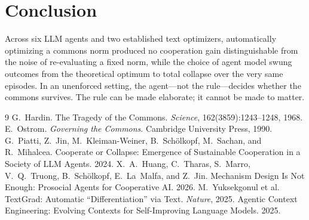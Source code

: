 \documentclass[11pt]{article}
\begin{document}
\section{Conclusion}
Across six LLM agents and two established text optimizers, automatically optimizing
a commons norm produced no cooperation gain distinguishable from the noise of
re-evaluating a fixed norm, while the choice of agent model swung outcomes from
the theoretical optimum to total collapse over the very same episodes. In an
unenforced setting, the agent---not the rule---decides whether the commons
survives. The rule can be made elaborate; it cannot be made to matter.

\begin{thebibliography}{9}
\small
{}
G.~Hardin. The Tragedy of the Commons. \emph{Science}, 162(3859):1243--1248, 1968.
E.~Ostrom. \emph{Governing the Commons}. Cambridge University Press, 1990.
G.~Piatti, Z.~Jin, M.~Kleiman-Weiner, B.~Sch\"olkopf, M.~Sachan, and R.~Mihalcea.
Cooperate or Collapse: Emergence of Sustainable Cooperation in a Society of LLM
Agents. 2024.
X.~A.~Huang, C.~Tharas, S.~Marro, V.~Q.~Truong, B.~Sch\"olkopf, E.~La~Malfa, and
Z.~Jin. Mechanism Design Is Not Enough: Prosocial Agents for Cooperative AI. 2026.
M.~Yuksekgonul et al. TextGrad: Automatic ``Differentiation'' via Text.
\emph{Nature}, 2025.
Agentic Context Engineering: Evolving Contexts for Self-Improving Language Models.
2025.
\end{thebibliography}
\end{document}
